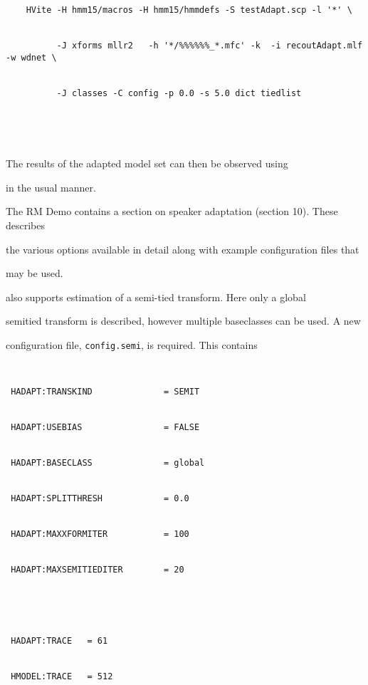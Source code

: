 \begin{verbatim}





    HVite -H hmm15/macros -H hmm15/hmmdefs -S testAdapt.scp -l '*' \ 


          -J xforms mllr2   -h '*/%%%%%%_*.mfc' -k  -i recoutAdapt.mlf -w wdnet \ 


          -J classes -C config -p 0.0 -s 5.0 dict tiedlist





\end{verbatim}





\noindent


The results of the adapted model set can then be observed using  


in the usual manner.


 


The RM Demo contains a section on speaker adaptation (section 10). These describes


the various options available  in detail along with example configuration files that


may be used.







 also supports estimation of a semi-tied transform. Here only a global


semitied transform is described, however multiple baseclasses can be used. A new


configuration file, \texttt{config.semi}, is required. This contains


\begin{verbatim}


 HADAPT:TRANSKIND              = SEMIT


 HADAPT:USEBIAS                = FALSE


 HADAPT:BASECLASS              = global


 HADAPT:SPLITTHRESH            = 0.0


 HADAPT:MAXXFORMITER           = 100


 HADAPT:MAXSEMITIEDITER        = 20





 HADAPT:TRACE   = 61


 HMODEL:TRACE   = 512


\end{verbatim}



